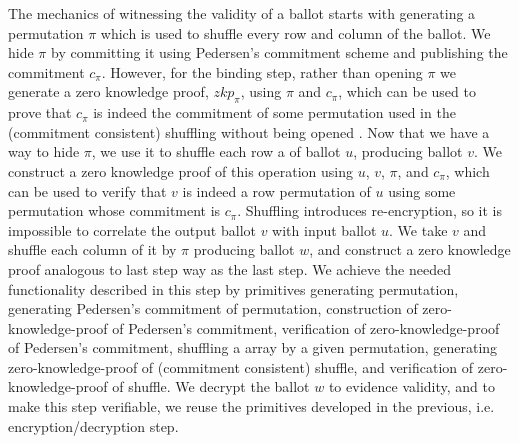\documentclass{llncs}
\begin{document}
The mechanics of witnessing the validity of a ballot starts with generating a 
permutation $\pi$ which is used to shuffle every row and column of the ballot.
We hide $\pi$ by committing it using Pedersen's 
commitment scheme 
and publishing  the commitment $c_{\pi}$. However, for the binding step, rather 
than opening $\pi$ we generate a zero knowledge proof, $zkp_{\pi}$, 
using $\pi$ and $c_{\pi}$, which can 
be  used to prove that $c_{\pi}$ is indeed the commitment of some permutation
used in the (commitment consistent) shuffling 
 without being opened \cite{Wikstrom:2009:CPS}. Now that we have a way 
 to hide $\pi$, we use it to shuffle each row a of 
ballot $u$, producing ballot $v$. We construct a zero knowledge proof 
of this operation using $u$, $v$, $\pi$, and $c_{\pi}$, which can be used 
to verify that $v$ is indeed a row permutation of $u$ using some permutation 
whose commitment is $c_{\pi}$. Shuffling 
introduces re-encryption, so it is impossible to correlate the output
ballot $v$ with input ballot $u$.  We take $v$ and shuffle each column of it 
by $\pi$ producing ballot $w$, and construct a zero knowledge proof 
analogous to last step
way as the last step. We achieve the needed functionality described in this step
by primitives
generating permutation, generating  Pedersen's 
commitment of permutation, construction of 
zero-knowledge-proof of Pedersen's commitment, verification of 
zero-knowledge-proof of Pedersen's commitment, shuffling a array 
by a given permutation, 
generating zero-knowledge-proof of (commitment consistent) shuffle, 
and verification of zero-knowledge-proof of shuffle.
We decrypt the ballot $w$ to evidence validity, and to make this step
 verifiable, we reuse the primitives developed in the
 previous, i.e. encryption/decryption step.
\end{document}
